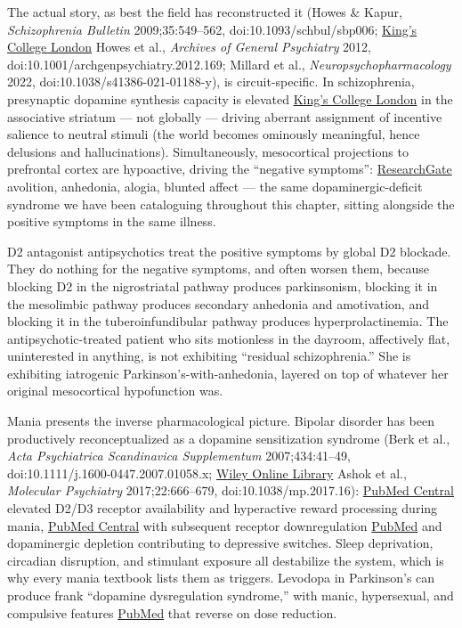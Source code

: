 The actual story, as best the field has reconstructed it (Howes \& Kapur, \emph{Schizophrenia Bulletin} 2009;35:549--562, doi:10.1093/schbul/sbp006; \href{https://kclpure.kcl.ac.uk/portal/en/publications/the-dopamine-hypothesis-of-schizophrenia-version-iii-025efthe-fin/}{King's College London} Howes et al., \emph{Archives of General Psychiatry} 2012, doi:10.1001/archgenpsychiatry.2012.169; Millard et al., \emph{Neuropsychopharmacology} 2022, doi:10.1038/s41386-021-01188-y), is circuit-specific. In schizophrenia, presynaptic dopamine synthesis capacity is elevated \href{https://kclpure.kcl.ac.uk/portal/en/publications/the-dopamine-hypothesis-of-schizophrenia-version-iii-025efthe-fin/}{King's College London} in the associative striatum --- not globally --- driving aberrant assignment of incentive salience to neutral stimuli (the world becomes ominously meaningful, hence delusions and hallucinations). Simultaneously, mesocortical projections to prefrontal cortex are hypoactive, driving the ``negative symptoms'': \href{https://www.researchgate.net/publication/24237892_The_Dopamine_Hypothesis_of_Schizophrenia_Version_III--The_Final_Common_Pathway}{ResearchGate} avolition, anhedonia, alogia, blunted affect --- the same dopaminergic-deficit syndrome we have been cataloguing throughout this chapter, sitting alongside the positive symptoms in the same illness.

D2 antagonist antipsychotics treat the positive symptoms by global D2 blockade. They do nothing for the negative symptoms, and often worsen them, because blocking D2 in the nigrostriatal pathway produces parkinsonism, blocking it in the mesolimbic pathway produces secondary anhedonia and amotivation, and blocking it in the tuberoinfundibular pathway produces hyperprolactinemia. The antipsychotic-treated patient who sits motionless in the dayroom, affectively flat, uninterested in anything, is not exhibiting ``residual schizophrenia.'' She is exhibiting iatrogenic Parkinson's-with-anhedonia, layered on top of whatever her original mesocortical hypofunction was.

Mania presents the inverse pharmacological picture. Bipolar disorder has been productively reconceptualized as a dopamine sensitization syndrome (Berk et al., \emph{Acta Psychiatrica Scandinavica Supplementum} 2007;434:41--49, doi:10.1111/j.1600-0447.2007.01058.x; \href{https://onlinelibrary.wiley.com/doi/10.1111/j.1600-0447.2007.01058.x}{Wiley Online Library} Ashok et al., \emph{Molecular Psychiatry} 2017;22:666--679, doi:10.1038/mp.2017.16): \href{https://pmc.ncbi.nlm.nih.gov/articles/PMC5401767/}{PubMed Central} elevated D2/D3 receptor availability and hyperactive reward processing during mania, \href{https://pmc.ncbi.nlm.nih.gov/articles/PMC5401767/}{PubMed Central} with subsequent receptor downregulation \href{https://pubmed.ncbi.nlm.nih.gov/17688462/}{PubMed} and dopaminergic depletion contributing to depressive switches. Sleep deprivation, circadian disruption, and stimulant exposure all destabilize the system, which is why every mania textbook lists them as triggers. Levodopa in Parkinson's can produce frank ``dopamine dysregulation syndrome,'' with manic, hypersexual, and compulsive features \href{https://pubmed.ncbi.nlm.nih.gov/17688462/}{PubMed} that reverse on dose reduction.

